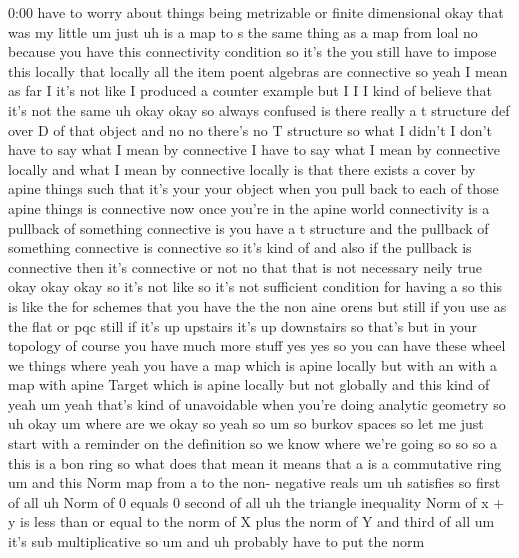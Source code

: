 \begin{unfinished}{0:00}
have  to  worry  about  things  being
metrizable  or  finite
dimensional  okay  that  was  my  little  um
just
uh  is  a  map  to  s  the  same  thing  as  a  map
from  loal  no  because  you  have  this
connectivity
condition  so  it's
the  you  still  have  to  impose  this
locally  that  locally  all  the  item  poent
algebras  are
connective  so
yeah  I  mean  as  far  I  it's  not  like  I
produced  a  counter  example  but  I  I  I
kind  of  believe  that  it's  not  the
same  uh  okay
okay
so  always  confused  is  there  really  a  t
structure  def  over  D  of  that  object  and
no  no  there's  no  T  structure  so  what  I
didn't  I  don't  have  to  say  what  I  mean
by  connective  I  have  to  say  what  I  mean
by  connective  locally  and  what  I  mean  by
connective  locally  is  that  there  exists
a  cover  by  apine  things  such  that  it's
your  your  object  when  you  pull  back  to
each  of  those  apine  things  is
connective  now  once  you're  in  the  apine
world  connectivity  is  a  pullback  of
something  connective  is  you  have  a  t
structure  and  the  pullback  of  something
connective  is  connective  so  it's  kind  of
and  also  if  the  pullback  is  connective
then  it's  connective  or  not  no  that  that
is  not  necessary  neily  true  okay  okay
okay  so  it's  not  like  so  it's  not
sufficient  condition  for  having
a  so  this  is  like  the  for  schemes  that
you  have  the  the  non  aine
orens  but  still  if  you  use  as  the  flat
or  pqc  still  if  it's  up  upstairs  it's  up
downstairs  so  that's  but  in  your
topology  of  course  you  have  much  more
stuff  yes  yes  so  you  can  have  these
wheel  we  things  where  yeah  you  have  a
map  which  is  apine  locally  but  with  an
with  a  map  with  apine  Target  which  is
apine  locally  but  not
globally  and  this  kind  of  yeah
um  yeah  that's  kind  of  unavoidable  when
you're  doing  analytic  geometry
so  uh  okay  um  where  are  we  okay  so  yeah
so  um  so  burkov
spaces  so  let  me  just  start  with  a
reminder  on  the  definition  so  we  know
where  we're  going  so  so  so  a  this  is  a
bon
ring  so  what  does  that  mean  it  means
that  a  is  a  commutative
ring  um  and  this  Norm  map  from  a  to  the
non-  negative  reals  um
uh
satisfies  so  first  of  all  uh  Norm  of  0
equals  0  second  of  all  uh  the  triangle
inequality  Norm  of  x  +  y  is  less  than  or
equal  to  the  norm  of  X  plus  the  norm  of
Y  and  third  of  all  um  it's  sub
multiplicative
so
um  and  uh  probably  have  to  put  the  norm

\end{unfinished}
